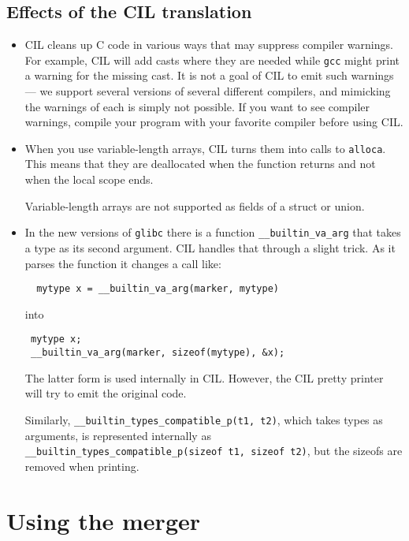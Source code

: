 \documentclass[letterpaper]{article}
\def\t#1{{\tt #1}}
\begin{document}
\subsection{Effects of the CIL translation}
\begin{itemize}
\item CIL cleans up C code in various ways that may suppress compiler
  warnings.  For example, CIL will add casts where they are needed
  while \t{gcc} might print a warning for the missing cast.  It is
  not a goal of CIL to emit such warnings --- we support several
  versions of several different compilers, and mimicking the warnings
  of each is simply not possible.  If you want to see compiler
  warnings, compile your program with your favorite compiler before
  using CIL.

\item When you use variable-length arrays, CIL turns them into calls
  to \t{alloca}. This means that they are deallocated when the
  function returns and not when the local scope ends.

  Variable-length arrays are not supported as fields of a struct or union.

\item In the new versions of \t{glibc} there is a function
  \t{\_\_builtin\_va\_arg} that takes a type as its second argument. CIL
  handles that through a slight trick. As it parses the function it changes a
  call like:
\begin{verbatim}
  mytype x = __builtin_va_arg(marker, mytype)
\end{verbatim}
 into 
\begin{verbatim}
 mytype x;
 __builtin_va_arg(marker, sizeof(mytype), &x);
\end{verbatim}

 The latter form is used internally in CIL. However, the CIL pretty printer
 will try to emit the original code. 

 Similarly, \t{\_\_builtin\_types\_compatible\_p(t1, t2)}, which takes
 types as arguments, is represented internally as
 \t{\_\_builtin\_types\_compatible\_p(sizeof t1, sizeof t2)}, but the
 sizeofs are removed when printing.

\end{itemize}





  \section{Using the merger}\label{sec-merger}
\end{document}
